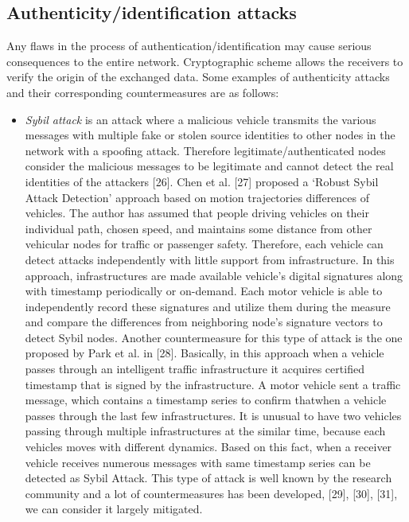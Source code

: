     \subsection{Authenticity/identification attacks}
    Any flaws in the process of authentication/identification may cause serious consequences to the entire network. Cryptographic scheme allows the receivers to verify the origin of the exchanged data. Some examples of authenticity attacks and their corresponding countermeasures are as follows:
    \begin{itemize}
        \item \textit{Sybil attack} is an attack where a malicious vehicle transmits the various messages with multiple fake or stolen source identities to other nodes in the network with a spoofing attack. Therefore legitimate/authenticated nodes consider the malicious messages to be legitimate and cannot detect the real identities of the attackers [26].
        \newline
        Chen et al. [27] proposed a ‘Robust Sybil Attack Detection’ approach based on motion trajectories differences of vehicles. The author has assumed that people driving vehicles on their individual path, chosen speed, and maintains some distance from other vehicular nodes for traffic or passenger safety. Therefore, each vehicle can detect attacks independently with little support from infrastructure. In this approach, infrastructures are made available vehicle’s digital signatures along with timestamp periodically or on-demand. Each motor vehicle is able to independently record these signatures and utilize them during the measure and compare the differences from neighboring node’s signature vectors to detect Sybil nodes.
        \newline
        Another countermeasure for this type of attack is the one proposed by Park et al. in [28]. Basically, in this approach when a vehicle passes through an intelligent traffic infrastructure it acquires certified timestamp that is signed by the infrastructure. A motor vehicle sent a traffic message, which contains a timestamp series to confirm thatwhen a vehicle passes through the last few infrastructures. It is unusual to have two vehicles passing through multiple infrastructures at the similar time, because each vehicles moves with different dynamics. Based on this fact, when a receiver vehicle receives numerous messages with same timestamp series can be detected as Sybil Attack.
        \newline
        This type of attack is well known by the research community and a lot of countermeasures has been developed, [29], [30], [31], we can consider it largely mitigated. 
        

\end{itemize}
